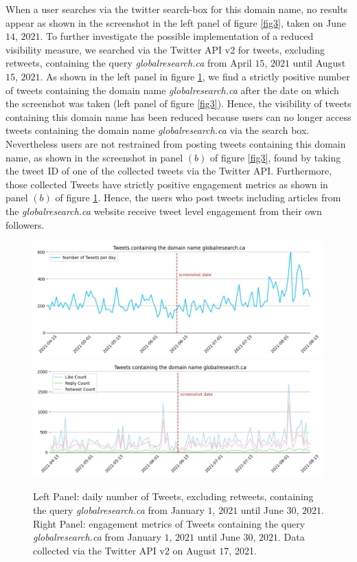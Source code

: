 \documentclass{article}
\begin{document}
\smallskip

When a user searches via the twitter search-box for this domain name, no results appear as shown in the screenshot in the left panel of figure \ref{fig3}, taken on June $14$, $2021$. To further investigate the possible implementation of a reduced visibility measure, we searched via the Twitter API v2 for tweets, excluding retweets, containing the query {\it globalresearch.ca} from April $15$, $2021$ until August $15$, $2021$.  As shown in the left panel in figure \ref{fig4}, we find a strictly positive number of tweets containing the domain name {\it globalresearch.ca} after the date on which the screenshot was taken (left panel of figure \ref{fig3}). Hence, the visibility of tweets containing this domain name has been reduced because users can no longer access tweets containing the domain name {\it globalresearch.ca} via the search box. Nevertheless users are not restrained from posting tweets containing this domain name, as shown in the screenshot in panel $(b)$ of figure \ref{fig3}, found by taking the tweet ID of one of the collected tweets via the Twitter API. Furthermore, those collected Tweets have strictly positive engagement metrics as shown in panel $(b)$ of figure \ref{fig4}. Hence, the users who post tweets including articles from the {\it globalresearch.ca} website receive tweet level engagement from their own followers. 

\begin{figure}[h]
\centering
		\includegraphics[scale=0.27]{../figure/globalresearch_domain_2021-08-17.jpg} 
		\includegraphics[scale=0.27]{../figure/globalresearch_domain_engagement_2021-08-17.jpg}
\caption{Left Panel: daily number of Tweets, excluding retweets, containing the query {\it globalresearch.ca} from January $1$, $2021$ until June $30$, $2021$. Right Panel: engagement metrics of Tweets containing the query {\it globalresearch.ca} from January $1$, $2021$ until June $30$, $2021$. Data collected via the Twitter API v2 on August $17$, 2021.   }
\label{fig4}
\end{figure}
\end{document}
